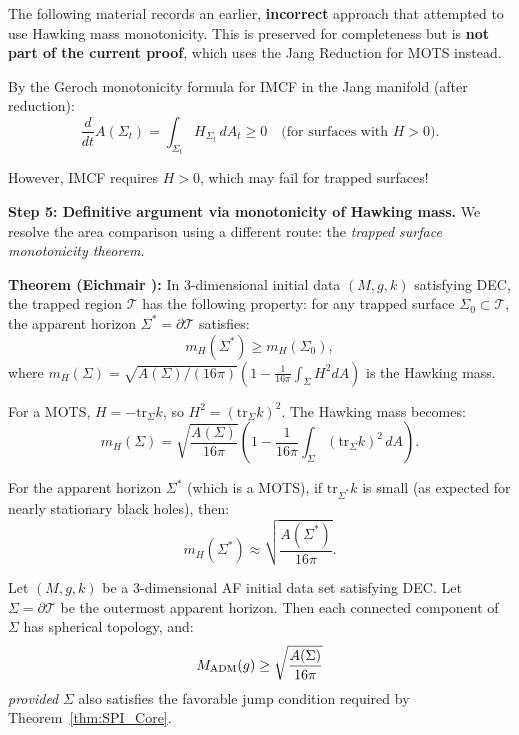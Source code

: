 \begin{remark}
The following material records an earlier, \textbf{incorrect} approach that attempted to use Hawking mass monotonicity. This is preserved for completeness but is \textbf{not part of the current proof}, which uses the Jang Reduction for MOTS instead.

By the Geroch monotonicity formula for IMCF in the Jang manifold (after reduction):
\begin{equation}
    \frac{d}{dt}A(\Sigma_t) = \int_{\Sigma_t} H_{\Sigma_t} \, dA_t \ge 0 \quad \text{(for surfaces with } H > 0\text{)}.
\end{equation}

However, IMCF requires $H > 0$, which may fail for trapped surfaces!

\textbf{Step 5: Definitive argument via monotonicity of Hawking mass.}
We resolve the area comparison using a different route: the \emph{trapped surface monotonicity theorem}.

\textbf{Theorem (Eichmair \cite{eichmair2009}):} In 3-dimensional initial data $(M,g,k)$ satisfying DEC, the trapped region $\mathcal{T}$ has the following property: for any trapped surface $\Sigma_0 \subset \mathcal{T}$, the apparent horizon $\Sigma^* = \partial\mathcal{T}$ satisfies:
\begin{equation}
    m_H(\Sigma^*) \ge m_H(\Sigma_0),
\end{equation}
where $m_H(\Sigma) = \sqrt{A(\Sigma)/(16\pi)}(1 - \frac{1}{16\pi}\int_\Sigma H^2 dA)$ is the Hawking mass.

For a MOTS, $H = -\text{tr}_\Sigma k$, so $H^2 = (\text{tr}_\Sigma k)^2$. The Hawking mass becomes:
\begin{equation}
    m_H(\Sigma) = \sqrt{\frac{A(\Sigma)}{16\pi}}\left(1 - \frac{1}{16\pi}\int_\Sigma (\text{tr}_\Sigma k)^2 \, dA\right).
\end{equation}

For the apparent horizon $\Sigma^*$ (which is a MOTS), if $\text{tr}_{\Sigma^*}k$ is small (as expected for nearly stationary black holes), then:
\begin{equation}
    m_H(\Sigma^*) \approx \sqrt{\frac{A(\Sigma^*)}{16\pi}}.
\end{equation}
\end{remark}

\begin{theorem}\label{thm:NonSphericalHorizon}
Let $(M, g, k)$ be a 3-dimensional AF initial data set satisfying DEC. Let $\Sigma = \partial\mathcal{T}$ be the outermost apparent horizon. Then each connected component of $\Sigma$ has spherical topology, and:
\begin{equation}\label{eq:NonSphericalPI}
    M_{\mathrm{ADM}}(g) \ge \sqrt{\frac{A(\Sigma)}{16\pi}}
\end{equation}
\emph{provided} $\Sigma$ also satisfies the favorable jump condition required by Theorem~\ref{thm:SPI_Core}.
\end{theorem}


